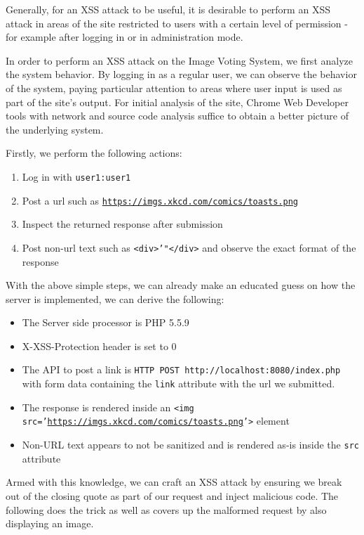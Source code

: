 \documentclass[a4paper, 12pt]{article}
\begin{document}
Generally, for an XSS attack to be useful, it is desirable to perform an XSS attack in areas of the site restricted to users with a certain level of permission - for example after logging in or in administration mode.

In order to perform an XSS attack on the Image Voting System, we first analyze the system behavior. By logging in as a regular user, we can observe the behavior of the system, paying particular attention to areas where user input is used as part of the site's output. For initial analysis of the site, Chrome Web Developer tools with network and source code analysis suffice to obtain a better picture of the underlying system.

Firstly, we perform the following actions:
\begin{enumerate}
  \item Log in with \texttt{user1:user1}
    \item Post a url such as \texttt{\url{https://imgs.xkcd.com/comics/toasts.png}}
    \item Inspect the returned response after submission
    \item Post non-url text such as \texttt{<div>'"</div>} and observe the exact format of the response
\end{enumerate}

With the above simple steps, we can already make an educated guess on how the server is implemented, we can derive the following:

\begin{itemize}
  \item The Server side processor is PHP 5.5.9
    \item X-XSS-Protection header is set to 0
    \item The API to post a link is \texttt{HTTP POST http://localhost:8080/index.php} with form data containing the \texttt{link} attribute with the url we submitted.
    \item The response is rendered inside an \texttt{<img src='\url{https://imgs.xkcd.com/comics/toasts.png}'>} element
    \item Non-URL text appears to not be sanitized and is rendered as-is inside the \texttt{src} attribute
\end{itemize}

Armed with this knowledge, we can craft an XSS attack by ensuring we break out of the closing quote as part of our request and inject malicious code. The following does the trick as well as covers up the malformed request by also displaying an image.
\end{document}
